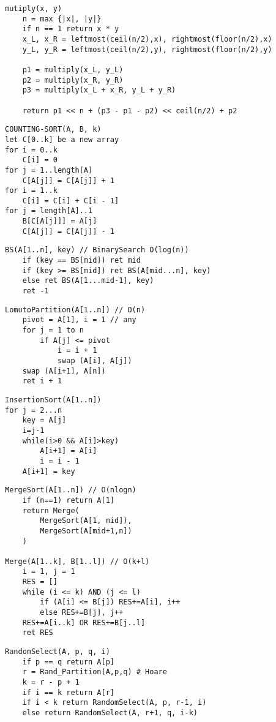 \documentclass[landscape,a4paper]{article}
\begin{document}
\begin{multicols}{5}
\begin{verbatim}
mutiply(x, y)
    n = max {|x|, |y|}
    if n == 1 return x * y
    x_L, x_R = leftmost(ceil(n/2),x), rightmost(floor(n/2),x)
    y_L, y_R = leftmost(ceil(n/2),y), rightmost(floor(n/2),y)

    p1 = multiply(x_L, y_L)
    p2 = multiply(x_R, y_R)
    p3 = multiply(x_L + x_R, y_L + y_R)

    return p1 << n + (p3 - p1 - p2) << ceil(n/2) + p2
\end{verbatim}

\begin{verbatim}
COUNTING-SORT(A, B, k)
let C[0..k] be a new array
for i = 0..k
    C[i] = 0
for j = 1..length[A]
    C[A[j]] = C[A[j]] + 1
for i = 1..k
    C[i] = C[i] + C[i - 1]
for j = length[A]..1
    B[C[A[j]]] = A[j]
    C[A[j]] = C[A[j]] - 1
\end{verbatim}

\begin{verbatim}
BS(A[1..n], key) // BinarySearch O(log(n))
    if (key == BS[mid]) ret mid
    if (key >= BS[mid]) ret BS(A[mid...n], key)
    else ret BS(A[1...mid-1], key)
    ret -1
\end{verbatim}

\begin{verbatim}
LomutoPartition(A[1..n]) // O(n)
    pivot = A[1], i = 1 // any
    for j = 1 to n
        if A[j] <= pivot
            i = i + 1
            swap (A[i], A[j])
    swap (A[i+1], A[n])
    ret i + 1
\end{verbatim}

\begin{verbatim}
InsertionSort(A[1..n])
for j = 2...n
    key = A[j]
    i=j-1
    while(i>0 && A[i]>key)
        A[i+1] = A[i]
        i = i - 1
    A[i+1] = key
\end{verbatim}

\begin{verbatim}
MergeSort(A[1..n]) // O(nlogn)
    if (n==1) return A[1]
    return Merge(
        MergeSort(A[1, mid]),
        MergeSort(A[mid+1,n])
    )

Merge(A[1..k], B[1..l]) // O(k+l)
    i = 1, j = 1
    RES = []
    while (i <= k) AND (j <= l)
        if (A[i] <= B[j]) RES+=A[i], i++
        else RES+=B[j], j++
    RES+=A[i..k] OR RES+=B[j..l]
    ret RES
\end{verbatim}

\begin{verbatim}
RandomSelect(A, p, q, i)
    if p == q return A[p]
    r = Rand_Partition(A,p,q) # Hoare
    k = r - p + 1
    if i == k return A[r]
    if i < k return RandomSelect(A, p, r-1, i)
    else return RandomSelect(A, r+1, q, i-k)
\end{verbatim}


\end{multicols}
\end{document}
